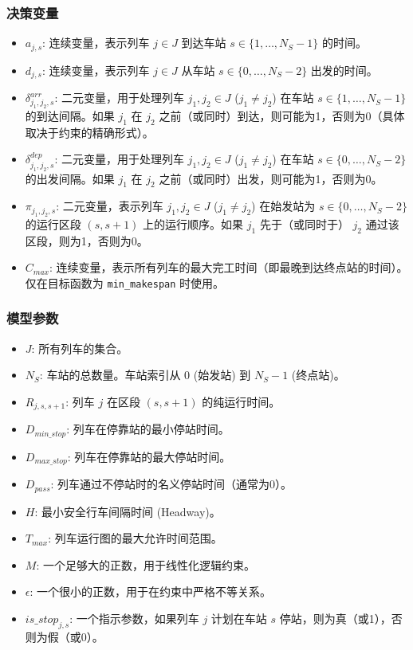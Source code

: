 \documentclass{article}
\begin{document}
\subsubsection{决策变量}
\begin{itemize}
    \item $a_{j,s}$: 连续变量，表示列车 $j \in J$ 到达车站 $s \in \{1, \dots, N_S-1\}$ 的时间。
    \item $d_{j,s}$: 连续变量，表示列车 $j \in J$ 从车站 $s \in \{0, \dots, N_S-2\}$ 出发的时间。
    \item $\delta^{arr}_{j_1,j_2,s}$: 二元变量，用于处理列车 $j_1, j_2 \in J$
        ($j_1 \neq j_2$) 在车站 $s \in \{1, \dots, N_S-1\}$ 的到达间隔。如果
        $j_1$ 在 $j_2$ 之前（或同时）到达，则可能为1，否则为0（具体取决于约束的精确形式）。
    \item $\delta^{dep}_{j_1,j_2,s}$: 二元变量，用于处理列车 $j_1, j_2 \in J$
        ($j_1 \neq j_2$) 在车站 $s \in \{0, \dots, N_S-2\}$ 的出发间隔。如果
        $j_1$ 在 $j_2$ 之前（或同时）出发，则可能为1，否则为0。
    \item $\pi_{j_1,j_2,s}$: 二元变量，表示列车 $j_1, j_2 \in J$ ($j_1 \neq
        j_2$) 在始发站为 $s \in \{0, \dots, N_S-2\}$ 的运行区段 $(s, s+1)$
        上的运行顺序。如果 $j_1$ 先于（或同时于） $j_2$ 通过该区段，则为1，否则为0。
    \item $C_{max}$: 连续变量，表示所有列车的最大完工时间（即最晚到达终点站的时间）。仅在目标函数为
        \texttt{min\_makespan} 时使用。
\end{itemize}

\subsubsection{模型参数}
\begin{itemize}
    \item $J$: 所有列车的集合。
    \item $N_S$: 车站的总数量。车站索引从 $0$ (始发站) 到 $N_S-1$ (终点站)。
    \item $R_{j,s,s+1}$: 列车 $j$ 在区段 $(s, s+1)$ 的纯运行时间。
    \item $D_{min\_stop}$: 列车在停靠站的最小停站时间。
    \item $D_{max\_stop}$: 列车在停靠站的最大停站时间。
    \item $D_{pass}$: 列车通过不停站时的名义停站时间（通常为0）。
    \item $H$: 最小安全行车间隔时间 (Headway)。
    \item $T_{max}$: 列车运行图的最大允许时间范围。
    \item $M$: 一个足够大的正数，用于线性化逻辑约束。
    \item $\epsilon$: 一个很小的正数，用于在约束中严格不等关系。
    \item $is\_stop_{j,s}$: 一个指示参数，如果列车 $j$ 计划在车站 $s$ 停站，则为真（或1），否则为假（或0）。
\end{itemize}
\end{document}
